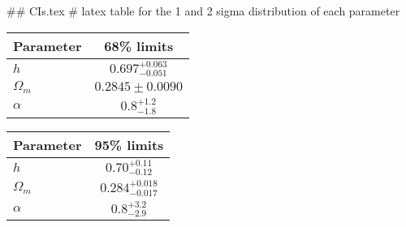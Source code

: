 ## CIs.tex
# latex table for the 1 and 2 sigma distribution of each parameter

\begin{tabular} { l  c}
 Parameter &  68\% limits\\
\hline
{\boldmath$h              $} & $0.697^{+0.063}_{-0.051}   $\\
{\boldmath$\Omega_m       $} & $0.2845\pm 0.0090          $\\
{\boldmath$\alpha         $} & $0.8^{+1.2}_{-1.8}         $\\
\hline
\end{tabular}

\begin{tabular} { l  c}
 Parameter &  95\% limits\\
\hline
{\boldmath$h              $} & $0.70^{+0.11}_{-0.12}      $\\
{\boldmath$\Omega_m       $} & $0.284^{+0.018}_{-0.017}   $\\
{\boldmath$\alpha         $} & $0.8^{+3.2}_{-2.9}         $\\
\hline
\end{tabular}
